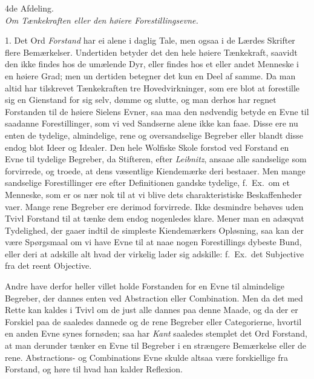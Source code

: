 \documentclass[12pt,a4paper]{article}
\newcommand{\afdeling}[2]{%
  \medskip\begin{center}{\large #1}\\[4pt]{\emph{#2}}\end{center}\smallskip}
\newcommand{\opage}[1]{\marginnote{\footnotesize\textit{[#1]}}}
\begin{document}
\afdeling{4de Afdeling.}{Om Tænkekraften eller den høiere Forestillingsevne.}

1. Det Ord \emph{Forstand} har ei alene i daglig Tale, men ogsaa i de Lærdes Skrifter
flere Bemærkelser. Undertiden betyder det den hele høiere Tænkekraft, saavidt den ikke
findes hos de umælende Dyr, eller findes hos et eller andet Menneske i en høiere Grad;
men un%
\opage{147}dertiden betegner det kun en Deel af samme. Da man altid har tilskrevet Tænkekraften tre
Hovedvirkninger, som ere blot at forestille sig en Gienstand for sig selv, dømme og
slutte, og man derhos har regnet Forstanden til de høiere Sielens Evner, saa maa den
nødvendig betyde en Evne til saadanne Forestillinger, som vi ved Sandserne alene ikke kan
faae. Disse ere nu enten de tydelige, almindelige, rene og oversandselige Begreber eller
blandt disse endog blot Ideer og Idealer. Den hele Wolfiske Skole forstod ved Forstand en
Evne til tydelige Begreber, da Stifteren, efter \emph{Leibnitz}, ansaae alle sandselige
som forvirrede, og troede, at dens væsentlige Kiendemærke deri bestaaer. Men mange
sandselige Forestillinger ere efter Definitionen gandske tydelige, f.~Ex.\ om et
Menneske, som er os nær nok til at vi blive dets charakteristiske Beskaffenheder vaer.
Mange rene Begreber ere derimod forvirrede. Ikke desmindre behøves uden Tvivl Forstand
til at tænke dem endog nogenledes klare. Mener man en adæqvat Tydelighed, der gaaer indtil
de simpleste Kiendemærkers Opløsning, saa kan der være Spørgsmaal om vi have Evne til at
naae nogen Forestillings dybeste Bund, eller deri at adskille alt hvad der virkelig lader
sig adskille: f.~Ex.\ det Subjective fra det reent Objective.

Andre have derfor heller villet holde Forstanden for en Evne til almindelige Begreber,
der dannes enten ved Abstraction eller Combination. Men da det med Rette
\opage{148} kan kaldes i Tvivl om de just alle dannes paa denne Maade, og da der er Forskiel paa de
saaledes dannede og de rene Begreber eller Categorierne, hvortil en anden Evne synes
fornøden; saa har \emph{Kant} saaledes stemplet det Ord Forstand, at man derunder tænker
en Evne til Begreber i en strængere Bemærkelse eller de rene. Abstractions- og
Combinations Evne skulde altsaa være forskiellige fra Forstand, og høre til hvad han
kalder Reflexion.
\end{document}

